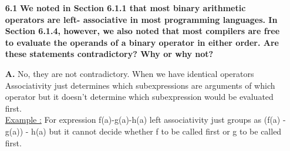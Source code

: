 \documentclass[letterpaper]{article}
\begin{document}
\begin{large}
\begin{flushleft}
\begin{enumerate}
\item[\textbf{6.1}]
\textbf{We noted in Section 6.1.1 that most binary arithmetic operators are left-
associative in most programming languages. In Section 6.1.4, however,
we also noted that most compilers are free to evaluate the operands of a
binary operator in either order. Are these statements contradictory? Why or
why not?}
\item[\textbf{A.}]
No, they are not contradictory. When we have identical operators Associativity just determines which subexpressions are arguments of which operator but it doesn't determine which subexpression would be evaluated first.\\
\underline{Example :} For expression f(a)-g(a)-h(a) left associativity just groups as (f(a) - g(a)) - h(a) but it cannot decide whether f to be called first or g to be called first.\\[0.2in]


\end{enumerate}
\end{flushleft}
\end{large}
\end{document}

